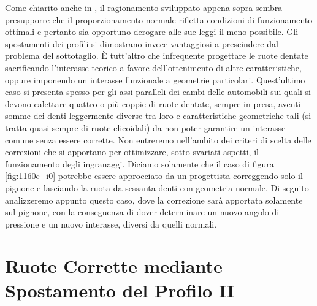 Come chiarito anche in \cite{righettini}, il ragionamento 
sviluppato appena sopra sembra presupporre che il proporzionamento normale
rifletta condizioni di funzionamento ottimali e pertanto sia opportuno
derogare alle sue leggi il meno possibile. Gli spostamenti dei profili si
dimostrano invece vantaggiosi a prescindere dal problema del sottotaglio.
\`E tutt'altro che infrequente progettare le ruote dentate sacrificando
l'interasse teorico a favore dell'ottenimento
di altre caratteristiche, oppure imponendo un 
interasse funzionale a geometrie particolari. Quest'ultimo
caso si presenta spesso
per gli assi paralleli dei cambi delle automobili sui quali si devono
calettare quattro o pi\`u coppie di ruote dentate, sempre in presa,
aventi somme
dei denti leggermente diverse tra loro e caratteristiche geometriche tali
(si tratta quasi sempre di ruote elicoidali)
da non poter garantire un interasse comune senza essere corrette.
 Non entreremo nell'ambito dei criteri
di scelta delle correzioni che si apportano per ottimizzare, sotto svariati
aspetti, il funzionamento degli ingranaggi. Diciamo solamente che il caso
di figura \ref{fig:1160c_i0} potrebbe essere approcciato da un progettista 
correggendo solo il pignone e lasciando la ruota da sessanta denti con geometria
normale. Di seguito analizzeremo appunto questo caso, dove la correzione sar\`a
apportata solamente sul pignone, con la conseguenza di dover 
determinare un nuovo angolo di
pressione e un nuovo interasse, diversi da quelli normali.


\section{Ruote Corrette mediante Spostamento del Profilo II}

